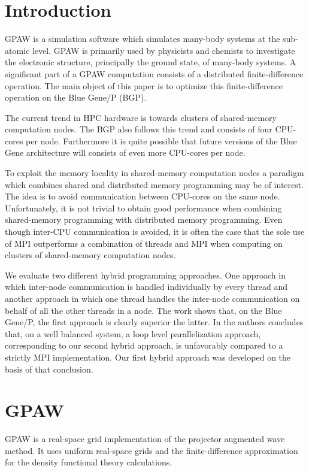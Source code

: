 \documentclass[preprint,3p,times,twocolumn]{elsarticle}
\begin{document}

\section{Introduction}
GPAW\cite{Mortensen05} is a simulation software which simulates many-body systems at the sub-atomic level. GPAW is primarily used by physicists and chemists to investigate the electronic structure, principally the ground state, of many-body systems. A significant part of a GPAW computation consists of a distributed finite-difference operation. The main object of this paper is to optimize this finite-difference operation on the Blue Gene/P\cite{BGPoverview} (BGP).

The current trend in HPC hardware is towards clusters of shared-memory computation nodes. The BGP also follows this trend and consists of four CPU-cores per node. Furthermore it is quite possible that future versions of the Blue Gene architecture will consists of even more CPU-cores per node.

To exploit the memory locality in shared-memory computation nodes a paradigm which combines shared and distributed memory programming may be of interest. The idea is to avoid communication between CPU-cores on the same node. Unfortunately, it is not trivial to obtain good performance when combining shared-memory programming with distributed memory programming. Even though inter-CPU communication is avoided, it is often the case that the sole use of MPI\cite{mpi} outperforms a combination of threads and MPI when computing on clusters of shared-memory computation nodes\cite{henty2000, hipp04Hybrid, VinterB}.

We evaluate two different hybrid programming approaches. One approach in which inter-node communication is handled individually by every thread and another approach in which one thread handles the inter-node communication on behalf of all the other threads in a node. The work shows that, on the Blue Gene/P, the first approach is clearly superior the latter. In \cite{Cappello2000} the authors concludes that, on a well balanced system, a loop level parallelization approach, corresponding to our second hybrid approach, is unfavorably compared to a strictly MPI implementation. Our first hybrid approach was developed on the basis of that conclusion.

\section{GPAW}
GPAW is a real-space grid implementation of the projector augmented wave method\cite{paw}. It uses uniform real-space grids and the finite-difference approximation for the density functional theory calculations.
\end{document}
